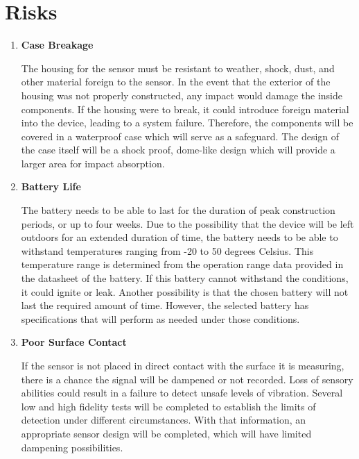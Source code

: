 \documentclass[12pt]{article}
\begin{document}
\section{Risks}
\begin{enumerate}
\item \textbf{Case Breakage}\vspace{1mm}

\noindent The housing for the sensor must be resistant to weather, shock, dust, and other material foreign to the sensor. In the event that the exterior of the housing was not properly constructed, any impact would damage the inside components. If the housing were to break, it could introduce foreign material into the device, leading to a system failure. Therefore, the components will be covered in a waterproof case which will serve as a safeguard. The design of the case itself will be a shock proof, dome-like design which will provide a larger area for impact absorption.\\

\item \noindent \textbf{Battery Life}\vspace{1mm}

\noindent The battery needs to be able to last for the duration of peak construction periods, or up to four weeks. Due to the possibility that the device will be left outdoors for an extended duration of time, the battery needs to be able to withstand temperatures ranging from -20 to 50 degrees Celsius. This temperature range is determined from the operation range data provided in the datasheet of the battery. If this battery cannot withstand the conditions, it could ignite or leak. Another possibility is that the chosen battery will not last the required amount of time. However, the selected battery has specifications that will perform as needed under those conditions.\\

\item \noindent \textbf{Poor Surface Contact}\vspace{1mm}

\noindent If the sensor is not placed in direct contact with the surface it is measuring, there is a chance the signal will be dampened or not recorded. Loss of sensory abilities could result in a failure to detect unsafe levels of vibration. Several low and high fidelity tests will be completed to establish the limits of detection under different circumstances. With that information, an appropriate sensor design will be completed, which will have limited dampening possibilities.\\


\end{enumerate}
\end{document}
